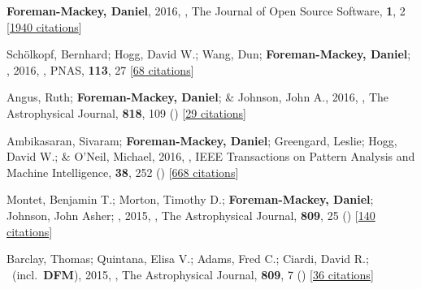 \item[{\color{numcolor}\scriptsize17}] \textbf{Foreman-Mackey, Daniel}, 2016, , The Journal of Open Source Software, \textbf{1}, 2 [\href{https://scholar.google.com/scholar?cites=1835087844145558435,17325274697099535179,14220488595059618709,12820425635803494730,7284810048757141243,17415935839493019063}{1940 citations}]

\item[{\color{numcolor}\scriptsize16}] Sch{\"o}lkopf, Bernhard; Hogg, David W.; Wang, Dun; \textbf{Foreman-Mackey, Daniel}; \etal, 2016, , PNAS, \textbf{113}, 27 [\href{https://scholar.google.com/scholar?cites=2429561747341807338}{68 citations}]

\item[{\color{numcolor}\scriptsize15}] Angus, Ruth; \textbf{Foreman-Mackey, Daniel}; \& Johnson, John A., 2016, , The Astrophysical Journal, \textbf{818}, 109 () [\href{https://ui.adsabs.harvard.edu/abs/2016ApJ...818..109A}{29 citations}]

\item[{\color{numcolor}\scriptsize14}] Ambikasaran, Sivaram; \textbf{Foreman-Mackey, Daniel}; Greengard, Leslie; Hogg, David W.; \& O'Neil, Michael, 2016, , IEEE Transactions on Pattern Analysis and Machine Intelligence, \textbf{38}, 252 () [\href{https://scholar.google.com/scholar?cites=7122560326210979193,5194420368165307096,3347404430934682534}{668 citations}]

\item[{\color{numcolor}\scriptsize13}] Montet, Benjamin T.; Morton, Timothy D.; \textbf{Foreman-Mackey, Daniel}; Johnson, John Asher; \etal, 2015, , The Astrophysical Journal, \textbf{809}, 25 () [\href{https://ui.adsabs.harvard.edu/abs/2015ApJ...809...25M}{140 citations}]

\item[{\color{numcolor}\scriptsize12}] Barclay, Thomas; Quintana, Elisa V.; Adams, Fred C.; Ciardi, David R.; \etal\ (incl.\ \textbf{DFM}), 2015, , The Astrophysical Journal, \textbf{809}, 7 () [\href{https://ui.adsabs.harvard.edu/abs/2015ApJ...809....7B}{36 citations}]

